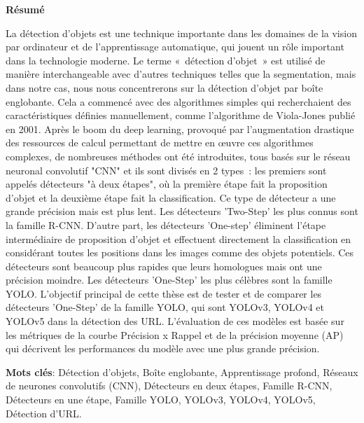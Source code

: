 \newpage
\thispagestyle{empty}
\begin{center}
{\Large \textbf{Résumé}}
\end{center}
%
La détection d'objets est une technique importante dans les domaines de la vision par ordinateur et de l'apprentissage automatique, qui jouent un rôle important dans la technologie moderne. Le terme « détection d'objet » est utilisé de manière interchangeable avec d'autres techniques telles que la segmentation, mais dans notre cas, nous nous concentrerons sur la détection d'objet par boîte englobante. Cela a commencé avec des algorithmes simples qui recherchaient des caractéristiques définies manuellement, comme l'algorithme de Viola-Jones publié en 2001. Après le boom du deep learning, provoqué par l'augmentation drastique des ressources de calcul permettant de mettre en œuvre ces algorithmes complexes, de nombreuses méthodes ont été introduites, tous basés sur le réseau neuronal convolutif "CNN" et ils sont divisés en 2 types : les premiers sont appelés détecteurs "à deux étapes", où la première étape fait la proposition d'objet et la deuxième étape fait la classification. Ce type de détecteur a une grande précision mais est plus lent. Les détecteurs 'Two-Step' les plus connus sont la famille R-CNN. D'autre part, les détecteurs 'One-step' éliminent l'étape intermédiaire de proposition d'objet et effectuent directement la classification en considérant toutes les positions dans les images comme des objets potentiels. Ces détecteurs sont beaucoup plus rapides que leurs homologues mais ont une précision moindre. Les détecteurs 'One-Step' les plus célèbres sont la famille YOLO. L'objectif principal de cette thèse est de tester et de comparer les détecteurs 'One-Step' de la famille YOLO, qui sont YOLOv3, YOLOv4 et YOLOv5 dans la détection des URL. L'évaluation de ces modèles est basée sur les métriques de la courbe Précision x Rappel et de la précision moyenne (AP) qui décrivent les performances du modèle avec une plus grande précision.

\vspace{0.5cm}
\textbf{Mots clés}: Détection d'objets, Boîte englobante, Apprentissage profond, Réseaux de neurones convolutifs (CNN), Détecteurs en deux étapes, Famille R-CNN, Détecteurs en une étape, Famille YOLO, YOLOv3, YOLOv4, YOLOv5, Détection d'URL.